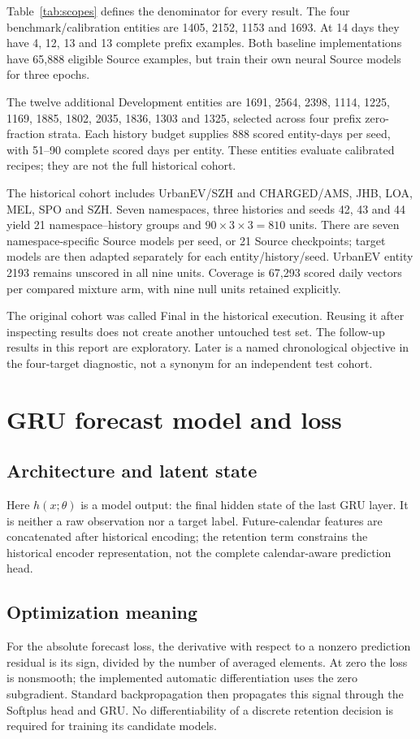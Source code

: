 \documentclass[pdflatex,iicol,sn-mathphys-num]{sn-jnl}
\begin{document}
Table~\ref{tab:scopes} defines the denominator for every result. The four benchmark/calibration entities are 1405, 2152, 1153 and 1693. At 14 days they have 4, 12, 13 and 13 complete prefix examples. Both baseline implementations have 65,888 eligible Source examples, but train their own neural Source models for three epochs.

The twelve additional Development entities are 1691, 2564, 2398, 1114, 1225, 1169, 1885, 1802, 2035, 1836, 1303 and 1325, selected across four prefix zero-fraction strata. Each history budget supplies 888 scored entity-days per seed, with 51--90 complete scored days per entity. These entities evaluate calibrated recipes; they are not the full historical cohort.

The historical cohort includes UrbanEV/SZH and CHARGED/AMS, JHB, LOA, MEL, SPO and SZH. Seven namespaces, three histories and seeds 42, 43 and 44 yield 21 namespace--history groups and $90\times3\times3=810$ units. There are seven namespace-specific Source models per seed, or 21 Source checkpoints; target models are then adapted separately for each entity/history/seed. UrbanEV entity 2193 remains unscored in all nine units. Coverage is 67,293 scored daily vectors per compared mixture arm, with nine null units retained explicitly.

The original cohort was called Final in the historical execution. Reusing it after inspecting results does not create another untouched test set. The follow-up results in this report are exploratory. Later is a named chronological objective in the four-target diagnostic, not a synonym for an independent test cohort.

\section{GRU forecast model and loss}
\subsection{Architecture and latent state}


Here $h(x;\theta)$ is a model output: the final hidden state of the last GRU layer. It is neither a raw observation nor a target label. Future-calendar features are concatenated after historical encoding; the retention term constrains the historical encoder representation, not the complete calendar-aware prediction head.

\subsection{Optimization meaning}
For the absolute forecast loss, the derivative with respect to a nonzero prediction residual is its sign, divided by the number of averaged elements. At zero the loss is nonsmooth; the implemented automatic differentiation uses the zero subgradient. Standard backpropagation then propagates this signal through the Softplus head and GRU. No differentiability of a discrete retention decision is required for training its candidate models.
\end{document}
